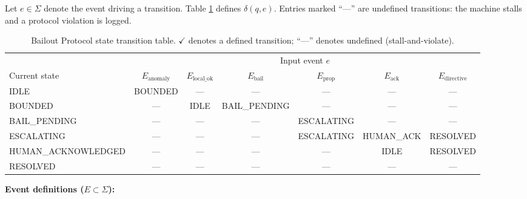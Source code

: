Let $e \in \Sigma$ denote the event driving a transition. Table
\ref{tab:bailout-transition} defines $\delta(q, e)$. Entries marked ``—''
are undefined transitions: the machine stalls and a protocol violation is logged.

\begin{table}[htbp]
\centering
\caption[Bailout Protocol state transition table.]
{Bailout Protocol state transition table. $\checkmark$ denotes a defined
transition; ``---'' denotes undefined (stall-and-violate).}
\label{tab:bailout-transition}
\bigskip
\begin{tabular}{@{}lcccccc@{}}
\toprule
 & \multicolumn{6}{c}{Input event $e$} \\
\cmidrule(l){2-7}
Current state & $E_{\text{anomaly}}$ & $E_{\text{local\_ok}}$ &
$E_{\text{bail}}$ & $E_{\text{prop}}$ & $E_{\text{ack}}$ &
$E_{\text{directive}}$ \\
\midrule
IDLE                  & BOUNDED           & ---            & ---           & ---            & ---            & --- \\
BOUNDED               & ---               & IDLE           & BAIL\_PENDING & ---            & ---            & --- \\
BAIL\_PENDING         & ---               & ---            & ---           & ESCALATING     & ---            & --- \\
ESCALATING            & ---               & ---            & ---           & ESCALATING     & HUMAN\_ACK     & RESOLVED \\
HUMAN\_ACKNOWLEDGED   & ---               & ---            & ---           & ---            & IDLE           & RESOLVED \\
RESOLVED              & ---               & ---            & ---           & ---            & ---            & ---
\end{tabular}
\end{table}

\bigskip
\noindent\textbf{Event definitions ($E \subset \Sigma$):}

